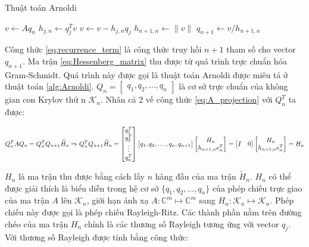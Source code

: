 \documentclass[14pt, a4paper]{article}
\numberwithin{equation}{section}
\numberwithin{algorithm}{section}
\numberwithin{figure}{section}
\numberwithin{dl}{section}
\numberwithin{md}{section}
\numberwithin{bd}{section}
\begin{document}
\begin{algorithm}
    \caption{Thuật toán Arnoldi}\label{alg:Arnoldi}
    \begin{algorithmic}
            \State $v \leftarrow Aq_n$
                \State $h_{j,n} \leftarrow q_j^T v$
                \State $v \leftarrow v - h_{j,n}q_j$
            \EndFor
            \State $h_{n+1,n} \leftarrow \lVert v \rVert$
            \State $q_{n+1} \leftarrow v/h_{n+1,n}$
        \EndFor
    \end{algorithmic}
\end{algorithm}

Công thức \ref{eq:recurrence_term} là công thức truy hồi $n+1$ tham số cho vector $q_{n+1}$. Ma trận \ref{eq:Hessenberg_matrix} thu được từ quá trình trực chuẩn hóa Gram-Schmidt. Quá trình này được gọi là thuật toán Arnoldi được miêu tả ở thuật toán \ref{alg:Arnoldi}. $Q_n=\begin{bmatrix} q_1, q_2, \dots, q_n \end{bmatrix}$ là cơ sở trực chuẩn của không gian con Krylov thứ n $\mathcal{K}_n$.
Nhân cả 2 vế công thức \ref{eq:A_projection} với $Q_n^T$ ta được:

\begin{equation}
    Q_n^TAQ_n=Q_n^TQ_{n+1}\widetilde{H}_n \\
    \Rightarrow Q_n^TQ_{n+1}\widetilde{H}_n = \begin{bmatrix}
        q_1^T \\ q_2^T \\ \vdots \\ q_n^T
    \end{bmatrix} \begin{bmatrix} q_1, q_2, \dots, q_n, q_{n+1} \end{bmatrix}
    \begin{bmatrix} H_n \\ h_{n+1,n}e_n^T \end{bmatrix}=\begin{bmatrix} I & 0 \end{bmatrix} \begin{bmatrix} H_n \\ h_{n+1,n}e_n^T \end{bmatrix}=H_n
\end{equation}

$H_n$ là ma trận thu được bằng cách lấy $n$ hàng đầu của ma trận $\widetilde{H}_n$. $H_n$ có thể được giải thích là biểu diễn trong hệ cơ sở $\lbrace q_1, q_2, \dots, q_n \rbrace$ của phép chiếu trực giao của ma trận $A$ lên $\mathcal{K}_n$, giới hạn ánh xạ $A: \mathbb{C}^m \mapsto \mathbb{C}^m$ sang $H_n: \mathcal{K}_n \mapsto \mathcal{K}_n$. Phép chiếu này được gọi là phép chiếu Rayleigh-Ritz.
Các thành phần nằm trên đường chéo của ma trận $H_n$ chính là các thương số Rayleigh tương ứng với vector $q_j$. Với thương số Rayleigh được tính bằng công thức:
\end{document}
